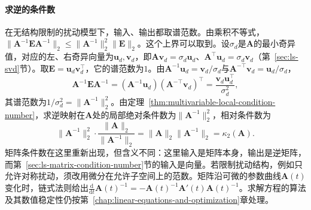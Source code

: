 \paragraph{求逆的条件数}
在无结构限制的扰动模型下，输入、输出都取谱范数。由乘积不等式，$\lVert\bm A^{-1}\bm E\bm A^{-1}\rVert_2\leq\lVert\bm A^{-1}\rVert_2^2\lVert\bm E\rVert_2$。这个上界可以取到。设$\sigma_d$是$\bm A$的最小奇异值，对应的左、右奇异向量为$\bm u_d,\bm v_d$，即$\bm A\bm v_d=\sigma_d\bm u_d$、$\bm A^\top\bm u_d=\sigma_d\bm v_d$（第~\ref{sec:ls-svd}节）。取$\bm E=\bm u_d\bm v_d^\top$，它的谱范数为$1$。由$\bm A^{-1}\bm u_d=\bm v_d/\sigma_d$与$\bm A^{-\top}\bm v_d=\bm u_d/\sigma_d$，
\[
 \bm A^{-1}\bm E\bm A^{-1}=(\bm A^{-1}\bm u_d)(\bm A^{-\top}\bm v_d)^\top=\frac{\bm v_d\bm u_d^\top}{\sigma_d^2},
\]
其谱范数为$1/\sigma_d^2=\lVert\bm A^{-1}\rVert_2^2$。由定理~\ref{thm:multivariable-local-condition-number}，求逆映射在$\bm A$处的局部绝对条件数为$\lVert\bm A^{-1}\rVert_2^2$，相对条件数为
\[
 \lVert\bm A^{-1}\rVert_2^2\cdot\frac{\lVert\bm A\rVert_2}{\lVert\bm A^{-1}\rVert_2}=\lVert\bm A\rVert_2\lVert\bm A^{-1}\rVert_2=\kappa_2(\bm A).
\]
矩阵条件数在这里重新出现，但含义不同：这里输入是矩阵本身，输出是逆矩阵，而第~\ref{sec:ls-matrix-condition-number}节的输入是向量。若限制扰动结构，例如只允许对称扰动，须改用微分在允许子空间上的范数。矩阵沿可微的参数曲线$\bm A(t)$变化时，链式法则给出$\frac{\mathrm d}{\mathrm dt}\bm A(t)^{-1}=-\bm A(t)^{-1}\bm A'(t)\bm A(t)^{-1}$。求解方程的算法及其数值稳定性仍按第~\ref{chap:linear-equations-and-optimization}章处理。

